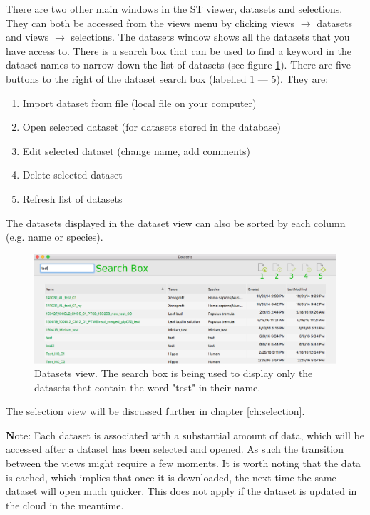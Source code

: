 \documentclass[10pt,a4paper,titlepage]{book}
\begin{document}
There are two other main windows in the ST viewer, datasets and selections. They can both be accessed from the views menu by clicking views $\rightarrow$ datasets and views $\rightarrow$ selections.
The datasets window shows all the datasets that you have access to. There is a search box that can be used to find a keyword in the dataset names to narrow down the list of datasets (see figure \ref{fig:datasets_view}). There are five buttons to the right of the dataset search box (labelled 1 --- 5). They are:
\begin{enumerate}
\item Import dataset from file (local file on your computer)
\item Open selected dataset (for datasets stored in the database)
\item Edit selected dataset (change name, add comments)
\item Delete selected dataset
\item Refresh list of datasets
\end{enumerate}

The datasets displayed in the dataset view can also be sorted by each column (e.g. name or species).
\begin{figure}[h]
	\centering
	\includegraphics[width=0.8\linewidth]{./Pictures/datasets}
	\caption[Datasets view.]{Datasets view. The search box is being used to display only the datasets that contain the word "test" in their name.}
	\label{fig:datasets_view}
\end{figure}

The selection view will be discussed further in chapter \ref{ch:selection}.


{ \textbf Note:} 
Each dataset is associated with a substantial amount of data, which will be accessed after a dataset has been selected and opened. As such the transition between the views might require a few moments. It is worth noting that the data is cached, which implies that once it is downloaded, the next time the same dataset will open much quicker. This does not apply if the dataset is updated in the cloud in the meantime.
\end{document}
